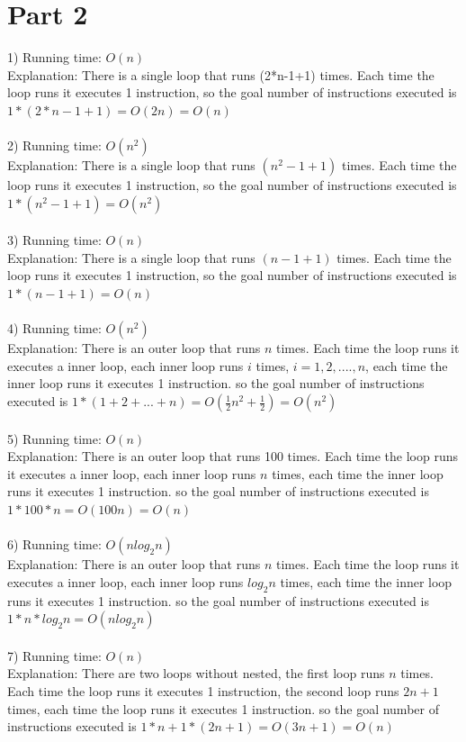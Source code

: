 \documentclass[12pt]{article}
\begin{document}
\section*{Part 2}
1) Running time: $O(n)$\\
Explanation: There is a single loop that runs (2*n-1+1) times. Each time the loop runs it executes 1 instruction, so the goal number  of instructions executed is $1*(2*n-1+1) = O(2n) = O(n)$\\
\\
2) Running time: $O(n^2)$\\
Explanation: There is a single loop that runs $(n^2-1+1)$ times. Each time the loop runs it executes 1 instruction, so the goal number  of instructions executed is $1*(n^2-1+1) = O(n^2)$\\
\\
3) Running time: $O(n)$\\
Explanation: There is a single loop that runs $(n-1+1)$ times. Each time the loop runs it executes 1 instruction, so the goal number  of instructions executed is $1*(n-1+1) = O(n)$\\
\\
4) Running time: $O(n^2)$\\
Explanation: There is an outer loop that runs $n$ times. Each time the loop runs it executes a inner loop, each inner loop runs $i$ times, $i = 1,2,....,n$, each time the inner loop runs it executes 1 instruction. so the goal number  of instructions executed is $1*(1+2+...+n) = O(\frac{1}{2}n^2+\frac{1}{2}) = O(n^2)$\\
\\
5) Running time: $O(n)$\\
Explanation: There is an outer loop that runs 100 times. Each time the loop runs it executes a inner loop, each inner loop runs $n$ times, each time the inner loop runs it executes 1 instruction. so the goal number  of instructions executed is $1*100*n = O(100n) = O(n)$\\
\\
6) Running time: $O(nlog_2n)$\\
Explanation: There is an outer loop that runs $n$ times. Each time the loop runs it executes a inner loop, each inner loop runs $log_{2}n$ times, each time the inner loop runs it executes 1 instruction. so the goal number  of instructions executed is $1*n*log_{2}n = O(nlog_2n)$\\
\\
7) Running time: $O(n)$\\
Explanation: There are two loops without nested, the first loop runs $n$ times. Each time the loop runs it executes 1 instruction, the second loop runs $2n+1$ times, each time the loop runs it executes 1 instruction. so the goal number of instructions executed is $1*n + 1*(2n+1) = O(3n+1) = O(n)$\\
\end{document}
